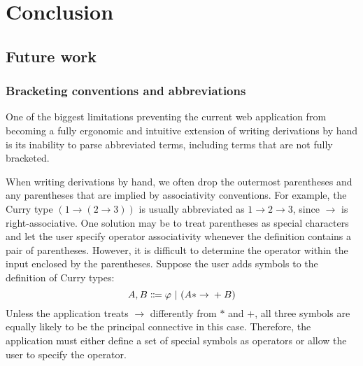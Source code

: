 \chapter{Conclusion}
\section{Future work}
\subsection{Bracketing conventions and abbreviations}
One of the biggest limitations preventing the current web application from becoming a fully ergonomic and intuitive extension of writing derivations by hand is its inability to parse abbreviated terms, including terms that are not fully bracketed.

When writing derivations by hand, we often drop the outermost parentheses and any parentheses that are implied by associativity conventions. For example, the Curry type $(1 \to (2 \to 3))$ is usually abbreviated as $1 \to 2 \to 3$, since $\to$ is right-associative. One solution may be to treat parentheses as special characters and let the user specify operator associativity whenever the definition contains a pair of parentheses. However, it is difficult to determine the operator within the input enclosed by the parentheses. Suppose the user adds symbols to the definition of Curry types:
\[
    A, B \Coloneqq \varphi \ |\  (A* \to{} +B)
\]
Unless the application treats $\to$ differently from $*$ and $+$, all three symbols are equally likely to be the principal connective in this case. Therefore, the application must either define a set of special symbols as operators or allow the user to specify the operator.

